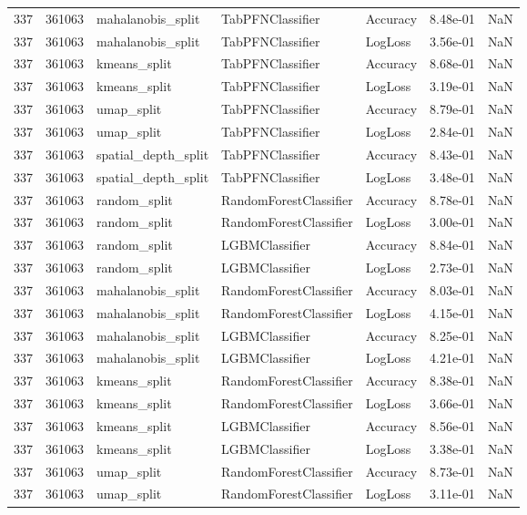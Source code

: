 \begin{tabular}{rrlllrr}
337 & 361063 & mahalanobis\_split & TabPFNClassifier & Accuracy & 8.48e-01 & NaN \\
337 & 361063 & mahalanobis\_split & TabPFNClassifier & LogLoss & 3.56e-01 & NaN \\
337 & 361063 & kmeans\_split & TabPFNClassifier & Accuracy & 8.68e-01 & NaN \\
337 & 361063 & kmeans\_split & TabPFNClassifier & LogLoss & 3.19e-01 & NaN \\
337 & 361063 & umap\_split & TabPFNClassifier & Accuracy & 8.79e-01 & NaN \\
337 & 361063 & umap\_split & TabPFNClassifier & LogLoss & 2.84e-01 & NaN \\
337 & 361063 & spatial\_depth\_split & TabPFNClassifier & Accuracy & 8.43e-01 & NaN \\
337 & 361063 & spatial\_depth\_split & TabPFNClassifier & LogLoss & 3.48e-01 & NaN \\
337 & 361063 & random\_split & RandomForestClassifier & Accuracy & 8.78e-01 & NaN \\
337 & 361063 & random\_split & RandomForestClassifier & LogLoss & 3.00e-01 & NaN \\
337 & 361063 & random\_split & LGBMClassifier & Accuracy & 8.84e-01 & NaN \\
337 & 361063 & random\_split & LGBMClassifier & LogLoss & 2.73e-01 & NaN \\
337 & 361063 & mahalanobis\_split & RandomForestClassifier & Accuracy & 8.03e-01 & NaN \\
337 & 361063 & mahalanobis\_split & RandomForestClassifier & LogLoss & 4.15e-01 & NaN \\
337 & 361063 & mahalanobis\_split & LGBMClassifier & Accuracy & 8.25e-01 & NaN \\
337 & 361063 & mahalanobis\_split & LGBMClassifier & LogLoss & 4.21e-01 & NaN \\
337 & 361063 & kmeans\_split & RandomForestClassifier & Accuracy & 8.38e-01 & NaN \\
337 & 361063 & kmeans\_split & RandomForestClassifier & LogLoss & 3.66e-01 & NaN \\
337 & 361063 & kmeans\_split & LGBMClassifier & Accuracy & 8.56e-01 & NaN \\
337 & 361063 & kmeans\_split & LGBMClassifier & LogLoss & 3.38e-01 & NaN \\
337 & 361063 & umap\_split & RandomForestClassifier & Accuracy & 8.73e-01 & NaN \\
337 & 361063 & umap\_split & RandomForestClassifier & LogLoss & 3.11e-01 & NaN \\

\end{tabular}
